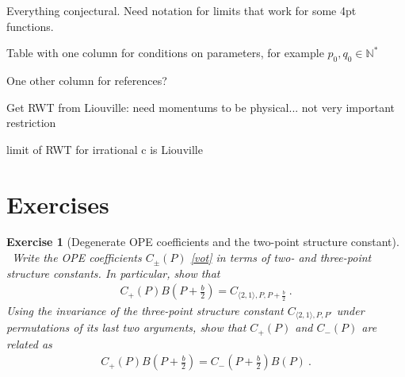 \documentclass[12pt, a4paper, notitlepage, twoside]{report}
\numberwithin{equation}{section}
\theoremstyle{break}
\newtheorem{exo}{Exercise}[chapter]
\begin{document}
Everything conjectural. Need notation for limits that work for some 4pt functions.

Table with one column for conditions on parameters, for example $p_0,q_0\in \mathbb{N}^*$

One other column for references?

Get RWT from Liouville: need momentums to be physical... not very important restriction

limit of RWT for irrational c is Liouville 

\section{Exercises}

\begin{exo}[Degenerate OPE coefficients and the two-point structure constant]
 ~\label{exocpcm}
 Write the OPE coefficients $C_\pm(P)$ \eqref{vot} in terms of two- and three-point structure constants. In particular, show that 
 \begin{align}
  C_+(P)B(P+\tfrac{b}{2}) = C_{\langle 2,1\rangle, P, P+\frac{b}{2}}\ . 
 \end{align}
 Using the invariance of the three-point structure constant $C_{\langle 2,1\rangle, P,P'}$ under permutations of its last two arguments, show that $C_+(P)$ and $C_-(P)$ are related as
 \begin{align}
  C_+(P)B(P+\tfrac{b}{2}) = C_-(P+\tfrac{b}{2}) B(P)\ .
 \end{align}
\end{exo}
\end{document}
